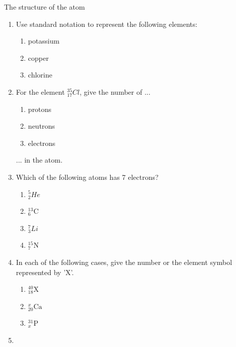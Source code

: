 \begin{exercises}{The structure of the atom}
\begin{enumerate}[noitemsep, label=\textbf{\arabic*}. ]
\begin{center}
\begin{tabular}{|p{1.4cm}|p{1.4cm}|p{1.4cm}|p{1.4cm}|p{1.4cm}|p{1.4cm}|}
\end{tabular}
\end{center}
    \par
          \label{m38745*uid20}\item Use standard notation to represent the following elements:
\label{m38745*id256772}\begin{enumerate}[noitemsep, label=\textbf{\alph*}. ] 
            \label{m38745*uid21}\item potassium
\label{m38745*uid22}\item copper
\label{m38745*uid23}\item chlorine
\end{enumerate}
                \label{m38745*uid24}\item 
For the element $_{17}^{35}Cl$, give the number of ...
\label{m38745*id256843}\begin{enumerate}[noitemsep, label=\textbf{\alph*}. ] 
            \label{m38745*uid25}\item protons
\label{m38745*uid26}\item neutrons
\label{m38745*uid27}\item electrons
\end{enumerate}
... in the atom.\newline
\label{m38745*uid28}\item Which of the following atoms has 7 electrons?
\label{m38745*id256898}\begin{enumerate}[noitemsep, label=\textbf{\alph*}. ] 
            \label{m38745*uid29}\item $_{2}^{5}He$
\label{m38745*uid30}\item $_{6}^{13}\mathrm{C}$
\label{m38745*uid31}\item $_{3}^{7}Li$
\label{m38745*uid32}\item $_{7}^{15}\mathrm{N}$
\end{enumerate}
                \label{m38745*uid33}\item 
In each of the following cases, give the number or the element symbol represented by 'X'.
\label{m38745*id257023}\begin{enumerate}[noitemsep, label=\textbf{\alph*}. ] 
            \label{m38745*uid34}\item $_{18}^{40}\mathrm{X}$
\label{m38745*uid35}\item $_{20}^{x}\mathrm{Ca}$
\label{m38745*uid36}\item $_{x}^{31}\mathrm{P}$
\end{enumerate}
                \label{m38745*uid37}\item 

\end{enumerate}
\end{exercises}
